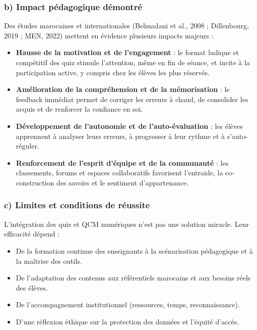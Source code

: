 \documentclass[a4paper,11pt]{report}
\begin{document}
\subsubsection*{b) Impact pédagogique démontré}
Des études marocaines et internationales (Belmadani et al., 2008 ; Dillenbourg, 2019 ; MEN, 2022) mettent en évidence plusieurs impacts majeurs :
\begin{itemize}
    \item \textbf{Hausse de la motivation et de l'engagement} : le format ludique et compétitif des quiz stimule l'attention, même en fin de séance, et incite à la participation active, y compris chez les élèves les plus réservés.
    \item \textbf{Amélioration de la compréhension et de la mémorisation} : le feedback immédiat permet de corriger les erreurs à chaud, de consolider les acquis et de renforcer la confiance en soi.
    \item \textbf{Développement de l'autonomie et de l'auto-évaluation} : les élèves apprennent à analyser leurs erreurs, à progresser à leur rythme et à s'auto-réguler.
    \item \textbf{Renforcement de l'esprit d'équipe et de la communauté} : les classements, forums et espaces collaboratifs favorisent l'entraide, la co-construction des savoirs et le sentiment d'appartenance.
\end{itemize}

\subsubsection*{c) Limites et conditions de réussite}
L'intégration des quiz et QCM numériques n'est pas une solution miracle. Leur efficacité dépend :
\begin{itemize}
    \item De la formation continue des enseignants à la scénarisation pédagogique et à la maîtrise des outils.
    \item De l'adaptation des contenus aux référentiels marocains et aux besoins réels des élèves.
    \item De l'accompagnement institutionnel (ressources, temps, reconnaissance).
    \item D'une réflexion éthique sur la protection des données et l'équité d'accès.
\end{itemize}
\end{document}
